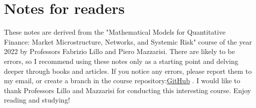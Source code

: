\chapter{Notes for readers}
\label{notes_for_reader}
These notes are derived from the "Mathematical Models for Quantitative Finance: Market Microstructure, Networks, and Systemic Risk" course of the year 2022 by Professors Fabrizio Lillo and Piero Mazzarisi. There are likely to be errors, so I recommend using these notes only as a starting point and delving deeper through books and articles. If you notice any errors, please report them to my email, or create a branch in the course repository:\href{https://github.com/lucaminuel/mathematical_models_for_quantitative_finance_notes}{GitHub} .
I would like to thank Professors Lillo and Mazzarisi for conducting this interesting course. Enjoy reading and studying!